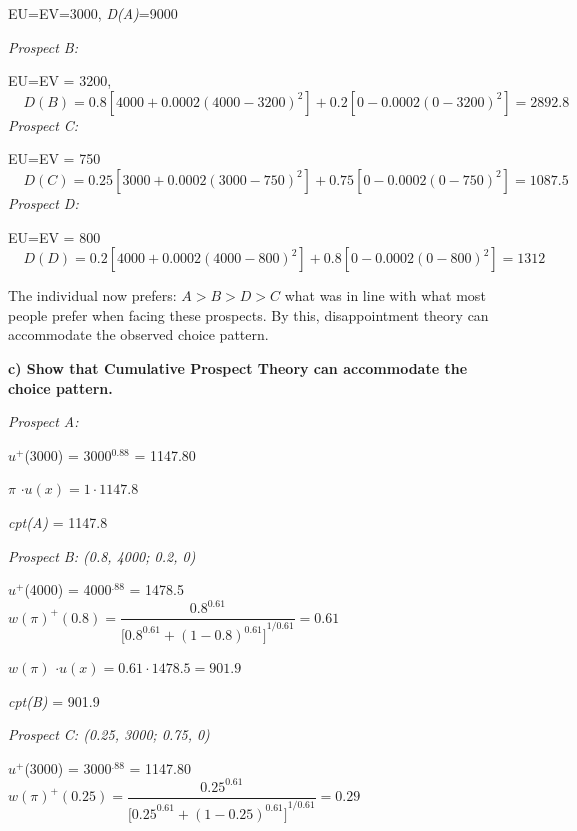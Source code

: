 \documentclass[12pt]{article}
\begin{document}
EU=EV=3000, \textit{D(A)}=9000

\vspace{5mm}

\noindent \textit{Prospect B:}

EU=EV = 3200, 
\[\ \ \ \ \ D\left(B\right)=0.8\left[4000+0.0002{\left(4000-3200\right)}^2\right]+0.2\left[0-0.0002{\left(0-3200\right)}^2\right]=2892.8\] 
\textit{Prospect C:}

\textit{ }EU=EV = 750
\[\ \ \ \ \ D\left(C\right)=0.25\left[3000+0.0002{\left(3000-750\right)}^2\right]+0.75\left[0-0.0002{\left(0-750\right)}^2\right]=1087.5\]
\textit{Prospect D:}

\textit{ }EU=EV = 800
\[\ \ \ \ \ D\left(D\right)=0.2\left[4000+0.0002{\left(4000-800\right)}^2\right]+0.8\left[0-0.0002{\left(0-800\right)}^2\right]=1312\]

\vspace{5mm}

\noindent The individual now prefers: $A>B>D>C$ what was in line with what most people prefer when facing these prospects. By this, disappointment theory can accommodate the observed choice pattern. 

\vspace{5mm}

\noindent \textbf{c) Show that Cumulative Prospect Theory can accommodate the choice pattern.}

\vspace{5mm}

\noindent \textit{Prospect A:}

$u{}^{+}$(3000) = 3000${}^{0.88}$ = 1147.80

$\pi$ $\cdot u(x) = 1 \cdot 1147.8$

\textit{cpt(A)} = 1147.8

\vspace{5mm}

\noindent \textit{Prospect B: (0.8, 4000; 0.2, 0)}

$u{}^{+}$(4000) = 4000${}^{.88}$ = 1478.5
\[w(\pi)^+\left(0.8\right)=\frac{{0.8}^{0.61}}{{{[0.8}^{0.61}+{(1-0.8)}^{0.61}]}^{{1}/{0.61}}}=0.61\ \ \ \ \ \ \ \ \ \ \ \ \ \ \ \ \ \ \ \ \ \ \ \ \ \ \ \ \ \ \ \ \ \ \ \ \ \ \ \ \ \ \ \ \ \ \ \ \ \ \ \ \ \ \ \ \ \ \ \ \ \ \ \ \ \ \ \ \ \ \ \ \] 

$w(\pi)$ $\cdot u(x) = 0.61 \cdot 1478.5=901.9$

\textit{cpt(B)} = 901.9

\noindent \textit{Prospect C: (0.25, 3000; 0.75, 0)}

$u^{+}$(3000) = 3000${}^{.88}$ = 1147.80
\[w(\pi)^+\left(0.25\right)=\frac{{0.25}^{0.61}}{{{[0.25}^{0.61}+{(1-0.25)}^{0.61}]}^{{1}/{0.61}}}=0.29\ \ \ \ \ \ \ \ \ \ \ \ \ \ \ \ \ \ \ \ \ \ \ \ \ \ \ \ \ \ \ \ \ \ \ \ \ \ \ \ \ \ \ \ \ \ \ \ \ \ \ \ \ \ \ \ \ \ \ \ \ \ \ \ \ \ \ \ \ \ \]
\end{document}
